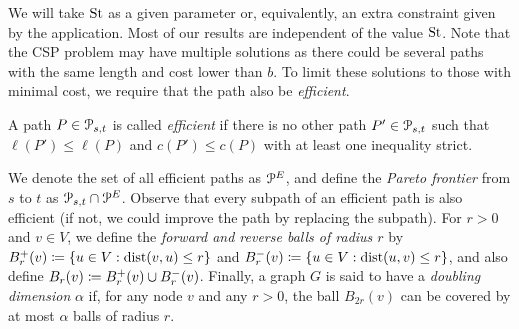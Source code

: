 We will take $\operatorname{St}$ as a given parameter or, equivalently, an extra constraint given by the application. 
Most of our results are independent of the value $\operatorname{St}$.
Note that the CSP problem may have multiple solutions as there could be several paths with the same length and cost lower than $b$.
To limit these solutions to those with minimal cost, we require that the path also be \emph{efficient}. 
\begin{definition}
\label{def:effpath}
A path $P\in \mathcal{P}_{s,t}$ is called \emph{efficient} if there is no other path $P'\in \mathcal{P}_{s,t}$ such that $\ell(P')\leq \ell(P)$ and $c(P')\leq c(P)$ with at least one inequality strict.
\end{definition}
We denote the set of all efficient paths as $\mathcal{P}^E$, and define the \emph{Pareto frontier} from $s$ to $t$ as $\mathcal{P}_{s,t}\cap\mathcal{P}^E$.
Observe that every subpath of an efficient path is also efficient (if not, we could improve the path by replacing the subpath).
For $r>0$ and $v\in V$, we define the \emph{forward and reverse balls of radius $r$} by $B^+_r(v)\coloneqq\{u\in V: \mbox{dist}(v,u)\leq r\}$ and $B^-_r(v)\coloneqq\{u\in V: \mbox{dist}(u,v)\leq r\}$, and also define $B_r(v)\coloneqq B^+_r(v)\cup B^-_r(v)$.
Finally, a graph $G$ is said to have a \emph{doubling dimension} $\alpha$ if, for any node $v$ and any $r>0$, the ball $B_{2r}(v)$ can be covered by at most $\alpha$ balls of radius $r$. 